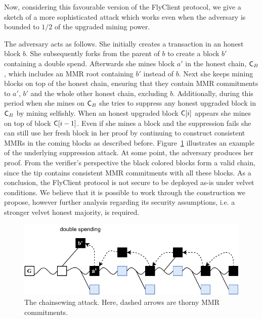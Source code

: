 	Now, considering this favourable version of the FlyClient protocol, we give a sketch of a more sophisticated attack which works
	even when the adversary is bounded to $1/2$ of the upgraded mining power.

    The adversary acts as follows.
		She initially creates a transaction in an honest block $b$. She subsequently forks from the parent of $b$ to create a block $b'$ containing
		a double spend.
    Afterwards she mines block $a'$ in the honest chain, $\mathsf{C}_B$, which includes an MMR root containing $b'$ instead of $b$.
    Next she keeps mining blocks on top of the honest chain, ensuring that they contain MMR commitments to
		$a'$, $b'$ and the whole other honest chain, excluding $b$.
    Additionally, during this period when she mines on $\mathsf{C}_B$ she tries to suppress any honest upgraded block in $\mathsf{C}_B$ by mining selfishly.
    When an honest upgraded block $\mathsf{C}[i]$ appears she mines on top of block $\mathsf{C}[i-1]$.
    Even if she mines a block and the suppression fails she can still use her fresh block in her proof by continuing to construct consistent MMRs
    in the coming blocks as described before.
		Figure~\ref{fig:combined_chainsewing_flyclient} illustrates an example of the underlying suppression attack.
    At some point, the adversary produces her proof.
    From the verifier's perspective the black colored blocks form a valid chain,
    since the tip contains consistent MMR commitments with all these blocks.
	As a conclusion, the FlyClient protocol is not secure to be deployed as-is under velvet conditions. We believe that it is possible to work through the construction we propose,
	however further analysis regarding its security assumptions, i.e. a stronger velvet honest majority, is required.

	\begin{figure}
		\begin{center}
			\includegraphics[width=0.95\columnwidth]{figures/flyclient_combined_attack.pdf}
		\end{center}
		\caption{The chainsewing attack. Here, dashed arrows are thorny MMR commitments.}
		\label{fig:combined_chainsewing_flyclient}
	\end{figure}
